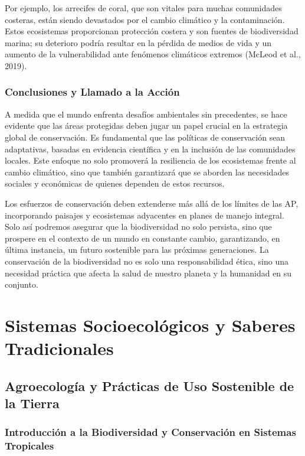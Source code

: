 \documentclass[
  letterpaper,
  DIV=11,
  numbers=noendperiod,
  oneside]{scrreprt}
\begin{document}
Por ejemplo, los arrecifes de coral, que son vitales para muchas
comunidades costeras, están siendo devastados por el cambio climático y
la contaminación. Estos ecosistemas proporcionan protección costera y
son fuentes de biodiversidad marina; su deterioro podría resultar en la
pérdida de medios de vida y un aumento de la vulnerabilidad ante
fenómenos climáticos extremos (McLeod et al., 2019).

\section{Conclusiones y Llamado a la
Acción}\label{conclusiones-y-llamado-a-la-acciuxf3n}

A medida que el mundo enfrenta desafíos ambientales sin precedentes, se
hace evidente que las áreas protegidas deben jugar un papel crucial en
la estrategia global de conservación. Es fundamental que las políticas
de conservación sean adaptativas, basadas en evidencia científica y en
la inclusión de las comunidades locales. Este enfoque no solo promoverá
la resiliencia de los ecosistemas frente al cambio climático, sino que
también garantizará que se aborden las necesidades sociales y económicas
de quienes dependen de estos recursos.

Los esfuerzos de conservación deben extenderse más allá de los límites
de las AP, incorporando paisajes y ecosistemas adyacentes en planes de
manejo integral. Solo así podremos asegurar que la biodiversidad no solo
persista, sino que prospere en el contexto de un mundo en constante
cambio, garantizando, en última instancia, un futuro sostenible para las
próximas generaciones. La conservación de la biodiversidad no es solo
una responsabilidad ética, sino una necesidad práctica que afecta la
salud de nuestro planeta y la humanidad en su conjunto.

\part{Sistemas Socioecológicos y Saberes Tradicionales}

\chapter{Agroecología y Prácticas de Uso Sostenible de la
Tierra}\label{agroecologuxeda-y-pruxe1cticas-de-uso-sostenible-de-la-tierra}

\section{Introducción a la Biodiversidad y Conservación en Sistemas
Tropicales}\label{introducciuxf3n-a-la-biodiversidad-y-conservaciuxf3n-en-sistemas-tropicales}
\end{document}
